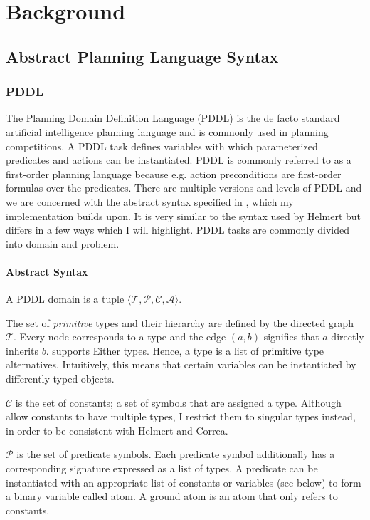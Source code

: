 
\chapter{Background}
\section{Abstract Planning Language Syntax}

\subsection{PDDL}
The Planning Domain Definition Language (PDDL) is the de facto standard artificial intelligence planning language and is commonly used in planning competitions.
A PDDL task defines variables with which parameterized predicates and actions can be instantiated. PDDL is commonly referred to as a first-order planning language because e.g. action preconditions are first-order formulas over the predicates.
There are multiple versions and levels of PDDL and we are concerned with the abstract syntax specified in \cite{AbLa}, which my implementation builds upon.
It is very similar to the syntax used by Helmert but differs in a few ways which I will highlight.
PDDL tasks are commonly divided into domain and problem.

\subsubsection{Abstract Syntax}
A PDDL domain is a tuple $\langle\mathcal T, \mathcal P, \mathcal C, \mathcal A\rangle$.

The set of \textit{primitive} types and their hierarchy are defined by the directed graph $\mathcal T$. Every node corresponds to a type and the edge $(a, b)$ signifies that $a$ directly inherits $b$.
\cite{AbLa} supports Either types. Hence, a type is a list of primitive type alternatives. Intuitively, this means that certain variables can be instantiated by differently typed objects.

$\mathcal C$ is the set of constants; a set of symbols that are assigned a type. Although \cite{AbLa} allow constants to have multiple types, I restrict them to singular types instead, in order to be consistent with Helmert and Correa.

$\mathcal P$ is the set of predicate symbols. Each predicate symbol additionally has a corresponding signature expressed as a list of types. A predicate can be instantiated with an appropriate list of constants or variables (see below) to form a binary variable called atom. A ground atom is an atom that only refers to constants.

